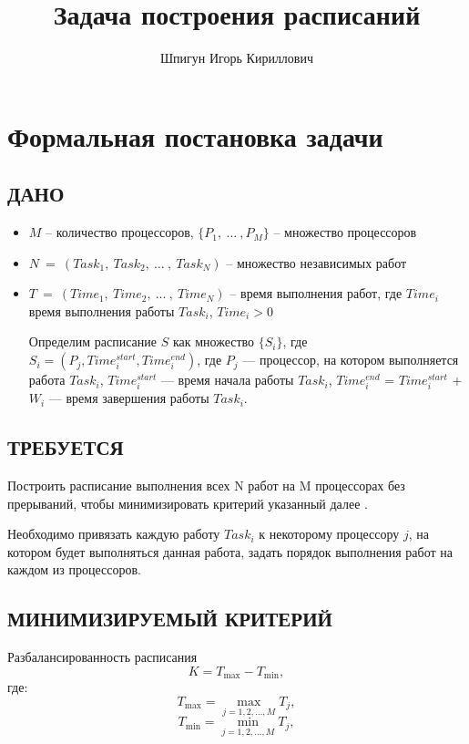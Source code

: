 \documentclass{article}
\title{Задача построения расписаний}
\author{Шпигун Игорь Кириллович}
\begin{document}
\maketitle


\section{Формальная постановка задачи}

\subsection{ДАНО}

\begin{itemize}
    \item $M$ -- количество процессоров, $\{P_1,\ \dots\ , P_M\}$ -- множество процессоров
    \item $N\ = \ (Task_1,\ Task_2,\ \dots\ ,\ Task_N)$ -- множество независимых работ
    \item $T\ =\ (Time_1,\ Time_2,\ \dots\ ,\ Time_N)$ -- время выполнения работ, где $Time_i$ время 
    выполнения работы $Task_i$, \( Time_i > 0 \)


Определим расписание $S$ как множество $\{S_i\}$, где $S_i = (P_j, Time_i^{start}, Time_i^{end})$, где $P_j$ — процессор, на котором выполняется работа $Task_i$, $Time_i^{start}$ — время начала работы $Task_i$, $Time_i^{end}$ = $Time_i^{start}$ + $W_i$ — время завершения работы $Task_i$.
    
\end{itemize}

\subsection{ТРЕБУЕТСЯ}

\hspace{15}Построить расписание выполнения всех N работ на M процессорах
без прерываний, чтобы минимизировать критерий указанный далее .

Необходимо привязать каждую работу $Task_i$ к некоторому процессору $j$, на котором будет выполняться  данная работа, задать порядок выполнения работ на каждом из процессоров. 


\subsection{МИНИМИЗИРУЕМЫЙ КРИТЕРИЙ}

Разбалансированность расписания
	\[
	K = T_{\text{max}} - T_{\text{min}},
	\]
	где:
	\[
	T_{\text{max}} = \max_{j=1, 2, \dots, M} T_j,
	\]
	\[
	T_{\text{min}} = \min_{j=1, 2, \dots, M} T_j,
	\]
\end{document}

